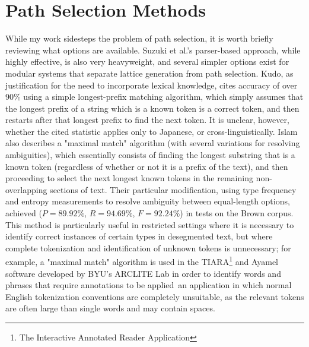 \section{Path Selection Methods}
While my work sidesteps the problem of path selection, it is worth briefly reviewing what options are available. Suzuki et al.'s\cite{suzuki00} parser-based approach, while highly effective, is also very heavyweight, and several simpler options exist for modular systems that separate lattice generation from path selection. Kudo\cite{kudo04}, as justification for the need to incorporate lexical knowledge, cites accuracy of over 90\% using a simple longest-prefix matching algorithm, which simply assumes that the longest prefix of a string which is a known token is a correct token, and then restarts after that longest prefix to find the next token. It is unclear, however, whether the cited statistic applies only to Japanese, or cross-linguistically. Islam\cite{islam07} also describes a "maximal match" algorithm (with several variations for resolving ambiguities), which essentially consists of finding the longest substring that is a known token (regardless of whether or not it is a prefix of the text), and then proceeding to select the next longest known tokens in the remaining non-overlapping sections of text. Their particular modification, using type frequency and entropy measurements to resolve ambiguity between equal-length options, achieved ($P = 89.92\%$, $R = 94.69\%$, $F = 92.24\%$) in tests on the Brown corpus. This method is particularly useful in restricted settings where it is necessary to identify correct instances of certain types in desegmented text, but where complete tokenization and identification of unknown tokens is unnecessary; for example, a "maximal match" algorithm is used in the TIARA\footnote{The Interactive Annotated Reader Application} and Ayamel software developed by BYU's ARCLITE Lab in order to identify words and phrases that require annotations to be applied\textemdash~an application in which normal English tokenization conventions are completely unsuitable, as the relevant tokens are often large than single words and may contain spaces.
